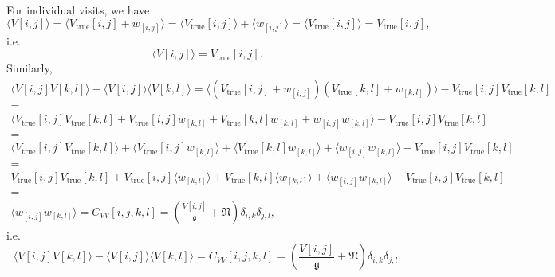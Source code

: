 \documentclass[times]{aastex6}
\begin{document}
For individual visits, we have
\begin{equation*}
  \langle V[i,j] \rangle = \langle V_{\mathrm{true}}[i,j] + w_{[i,j]} \rangle = \langle V_{\mathrm{true}}[i,j] \rangle + \langle w_{[i,j]} \rangle = \langle V_{\mathrm{true}}[i,j] \rangle = V_{\mathrm{true}}[i,j],
\end{equation*}
i.e.
\begin{equation}\label{eq:VisitMean}
  \langle V[i,j] \rangle = V_{\mathrm{true}}[i,j].
\end{equation}
Similarly,
\begin{multline*}
  \langle V[i,j]V[k,l] \rangle - \langle V[i,j] \rangle \langle V[k,l] \rangle = \langle (V_{\mathrm{true}}[i,j] + w_{[i,j]})(V_{\mathrm{true}}[k,l] + w_{[k,l]}) \rangle - V_{\mathrm{true}}[i,j]V_{\mathrm{true}}[k,l] \\ = \\ \langle V_{\mathrm{true}}[i,j]V_{\mathrm{true}}[k,l] + V_{\mathrm{true}}[i,j]w_{[k,l]} + V_{\mathrm{true}}[k,l]w_{[k,l]} + w_{[i,j]}w_{[k,l]} \rangle - V_{\mathrm{true}}[i,j]V_{\mathrm{true}}[k,l] \\ = \\ \langle V_{\mathrm{true}}[i,j]V_{\mathrm{true}}[k,l] \rangle + \langle V_{\mathrm{true}}[i,j]w_{[k,l]} \rangle + \langle V_{\mathrm{true}}[k,l]w_{[k,l]} \rangle + \langle w_{[i,j]}w_{[k,l]} \rangle - V_{\mathrm{true}}[i,j]V_{\mathrm{true}}[k,l] \\ = \\ V_{\mathrm{true}}[i,j]V_{\mathrm{true}}[k,l] + V_{\mathrm{true}}[i,j] \langle w_{[k,l]} \rangle + V_{\mathrm{true}}[k,l] \langle w_{[k,l]} \rangle + \langle w_{[i,j]}w_{[k,l]} \rangle - V_{\mathrm{true}}[i,j]V_{\mathrm{true}}[k,l] \\ = \\ \langle w_{[i,j]}w_{[k,l]} \rangle = C_{VV}[i,j,k,l] = \left ( \frac{V[i,j]}{\mathfrak{g}} + \mathfrak{N} \right )\delta_{i,k}\delta_{j,l},
\end{multline*}
i.e.
\begin{equation}\label{eq:VisitCovariance}
  \langle V[i,j]V[k,l] \rangle - \langle V[i,j] \rangle \langle V[k,l] \rangle = C_{VV}[i,j,k,l] = \left ( \frac{V[i,j]}{\mathfrak{g}} + \mathfrak{N} \right )\delta_{i,k}\delta_{j,l}.
\end{equation}

\medskip
\end{document}
